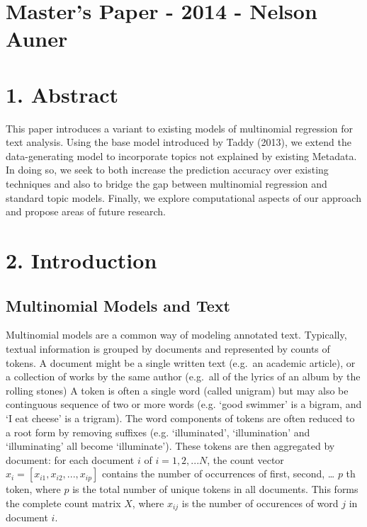 \documentclass[]{article}
\author{}
\date{}
\begin{document}
\section{Master's Paper - 2014 - Nelson
Auner}\label{masters-paper---2014---nelson-auner}

\section{1. Abstract}\label{abstract}

This paper introduces a variant to existing models of multinomial
regression for text analysis. Using the base model introduced by Taddy
(2013), we extend the data-generating model to incorporate topics not
explained by existing Metadata. In doing so, we seek to both increase
the prediction accuracy over existing techniques and also to bridge the
gap between multinomial regression and standard topic models. Finally,
we explore computational aspects of our approach and propose areas of
future research.

\section{2. Introduction}\label{introduction}

\subsection{Multinomial Models and
Text}\label{multinomial-models-and-text}

Multinomial models are a common way of modeling annotated text.
Typically, textual information is grouped by documents and represented
by counts of tokens. A document might be a single written text (e.g.~an
academic article), or a collection of works by the same author (e.g.~all
of the lyrics of an album by the rolling stones) A token is often a
single word (called unigram) but may also be continguous sequence of two
or more words (e.g. `good swimmer' is a bigram, and `I eat cheese' is a
trigram). The word components of tokens are often reduced to a root form
by removing suffixes (e.g. `illuminated', `illumination' and
`illuminating' all become `illuminate'). These tokens are then
aggregated by document: for each document $i$ of $i = 1,2,...N$, the
count vector $x_i = [x_{i1}, x_{i2}, ... , x_{ip}]$ contains the number
of occurrences of first, second, \ldots{} $p$ th token, where $p$ is the
total number of unique tokens in all documents. This forms the complete
count matrix $X$, where $x_{ij}$ is the number of occurences of word $j$
in document $i$.
\end{document}
